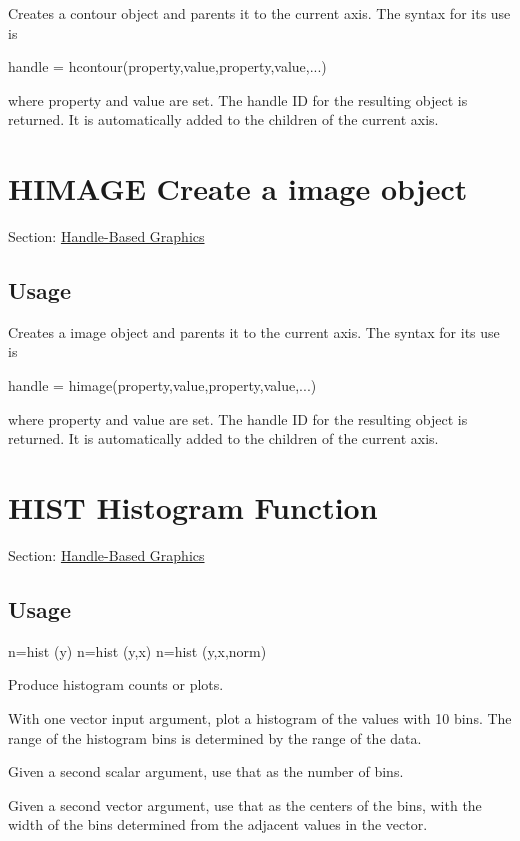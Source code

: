 Creates a contour object and parents it to the current axis. The syntax for its use is \begin{DoxyVerb}  handle = hcontour(property,value,property,value,...)
\end{DoxyVerb}
 where {\ttfamily property} and {\ttfamily value} are set. The handle I\-D for the resulting object is returned. It is automatically added to the children of the current axis. \hypertarget{handle_himage}{}\section{H\-I\-M\-A\-G\-E Create a image object}\label{handle_himage}
Section\-: \hyperlink{sec_handle}{Handle-\/\-Based Graphics} \hypertarget{vtkwidgets_vtkxyplotwidget_Usage}{}\subsection{Usage}\label{vtkwidgets_vtkxyplotwidget_Usage}
Creates a image object and parents it to the current axis. The syntax for its use is \begin{DoxyVerb}  handle = himage(property,value,property,value,...)
\end{DoxyVerb}
 where {\ttfamily property} and {\ttfamily value} are set. The handle I\-D for the resulting object is returned. It is automatically added to the children of the current axis. \hypertarget{handle_hist}{}\section{H\-I\-S\-T Histogram Function}\label{handle_hist}
Section\-: \hyperlink{sec_handle}{Handle-\/\-Based Graphics} \hypertarget{vtkwidgets_vtkxyplotwidget_Usage}{}\subsection{Usage}\label{vtkwidgets_vtkxyplotwidget_Usage}
\begin{DoxyVerb}        n=hist (y)
        n=hist (y,x)
        n=hist (y,x,norm)
\end{DoxyVerb}
 Produce histogram counts or plots.

With one vector input argument, plot a histogram of the values with 10 bins. The range of the histogram bins is determined by the range of the data.

Given a second scalar argument, use that as the number of bins.

Given a second vector argument, use that as the centers of the bins, with the width of the bins determined from the adjacent values in the vector.

